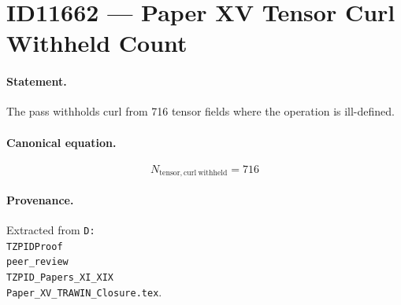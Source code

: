 \section*{ID11662 --- Paper XV Tensor Curl Withheld Count}

\paragraph{Statement.}
The pass withholds curl from 716 tensor fields where the operation is ill-defined.

\paragraph{Canonical equation.}
\[
N_{\mathrm{tensor,curl\ withheld}}=716
\]

\paragraph{Provenance.}
Extracted from \texttt{D:\\TZPIDProof\\peer\_review\\TZPID\_Papers\_XI\_XIX\\Paper\_XV\_TRAWIN\_Closure.tex}.
